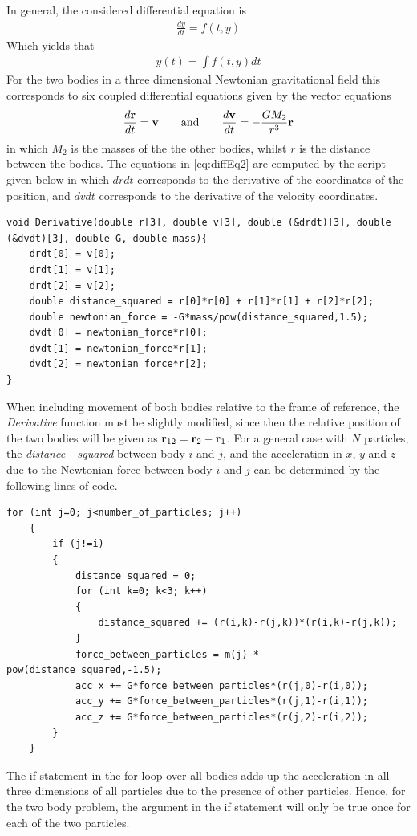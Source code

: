 In general, the considered differential equation is
\begin{align}
	\frac{dy}{dt} = f(t,y)
	\label{eq:diffEq1}
\end{align}
Which yields that
\begin{align}
	y(t) = \int f(t,y) dt
\end{align}
For the two bodies in a three dimensional Newtonian gravitational field this corresponds to six coupled differential equations given by the vector equations
\begin{align}
	\frac{d\mbox{\textbf{r}}}{dt} = \mbox{\textbf{v}}
	\qquad \text{and} \qquad
	\frac{d\mbox{\textbf{v}}}{dt} = - \frac{G M_2}{r^3} \mbox{\textbf{r}}
	\label{eq:diffEq2}
\end{align}
in which $M_2$ is the masses of the the other bodies, whilst $r$ is the distance between the bodies.
The equations in \eqref{eq:diffEq2} are computed by the script given below in which $drdt$ corresponds to the derivative of the coordinates of the position, and $dvdt$ corresponds to the derivative of the velocity coordinates. 
\begin{lstlisting}
void Derivative(double r[3], double v[3], double (&drdt)[3], double (&dvdt)[3], double G, double mass){
    drdt[0] = v[0];
    drdt[1] = v[1];
    drdt[2] = v[2];
    double distance_squared = r[0]*r[0] + r[1]*r[1] + r[2]*r[2];
    double newtonian_force = -G*mass/pow(distance_squared,1.5);
    dvdt[0] = newtonian_force*r[0];
    dvdt[1] = newtonian_force*r[1];
    dvdt[2] = newtonian_force*r[2];
}
\end{lstlisting}
When including movement of both bodies relative to the frame of reference, the \textit{Derivative} function must be slightly modified, since then the relative position of the two bodies will be given as $\mbox{\textbf{r}}_{12} = \mbox{\textbf{r}}_2 - \mbox{\textbf{r}}_1$.
For a general case with $N$ particles, the \textit{distance\_ squared} between body $i$ and $j$, and the acceleration in $x$, $y$ and $z$ due to the Newtonian force between body $i$ and $j$ can be determined by the following lines of code.
\begin{lstlisting}
for (int j=0; j<number_of_particles; j++)
    {
        if (j!=i)
        {
            distance_squared = 0;
            for (int k=0; k<3; k++)
            {
                distance_squared += (r(i,k)-r(j,k))*(r(i,k)-r(j,k));
            }
            force_between_particles = m(j) * pow(distance_squared,-1.5);
            acc_x += G*force_between_particles*(r(j,0)-r(i,0));
            acc_y += G*force_between_particles*(r(j,1)-r(i,1));
            acc_z += G*force_between_particles*(r(j,2)-r(i,2));
        }
    }
\end{lstlisting}
The if statement in the for loop over all bodies adds up the acceleration in all three dimensions of all particles due to the presence of other particles.
Hence, for the two body problem, the argument in the if statement will only be true once for each of the two particles.